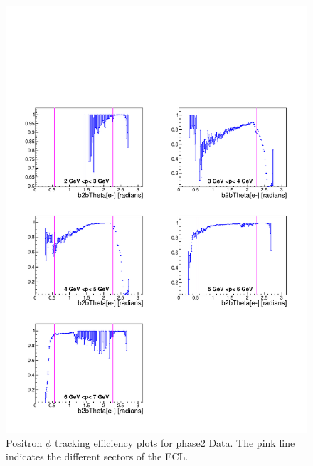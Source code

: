 \documentclass[a4paper,11pt,twosided,final,german,openbib,pdftex,listof=totoc,bibliography=totoc]{scrbook}
\begin{document}
\begin{appendix}
\begin{figure}[!htbp]
	\centering
	\includegraphics[width=\textwidth]{Plots/master/xPMThetaep_Data}
	\caption[Momentum $\theta$ Positron Efficiency Phase2 Data]{Positron $\phi$ tracking efficiency plots for phase2 Data. The pink line indicates the different sectors of the ECL.}
	\label{plt:PMThetaep_Data}
\end{figure}


\clearpage











\end{appendix}
\end{document}
